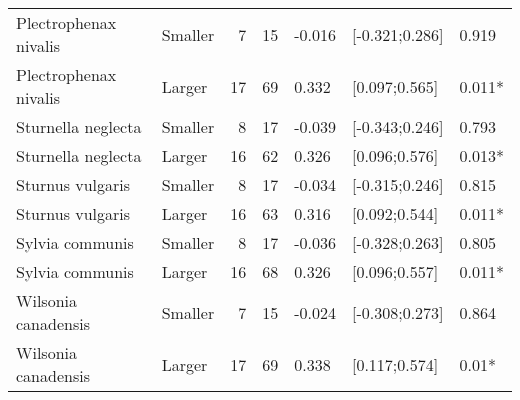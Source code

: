 \documentclass{article}
\begin{document}
\begin{table}[H]
\begin{tabular}{llrrlll}
  Plectrophenax nivalis & Smaller & 7 & 15 & -0.016 & [-0.321;0.286] & 0.919 \\ 
  Plectrophenax nivalis & Larger & 17 & 69 & 0.332 & [0.097;0.565] & 0.011* \\ 
  Sturnella neglecta & Smaller & 8 & 17 & -0.039 & [-0.343;0.246] & 0.793 \\ 
  Sturnella neglecta & Larger & 16 & 62 & 0.326 & [0.096;0.576] & 0.013* \\ 
  Sturnus vulgaris & Smaller & 8 & 17 & -0.034 & [-0.315;0.246] & 0.815 \\ 
  Sturnus vulgaris & Larger & 16 & 63 & 0.316 & [0.092;0.544] & 0.011* \\ 
  Sylvia communis & Smaller & 8 & 17 & -0.036 & [-0.328;0.263] & 0.805 \\ 
  Sylvia communis & Larger & 16 & 68 & 0.326 & [0.096;0.557] & 0.011* \\ 
  Wilsonia canadensis & Smaller & 7 & 15 & -0.024 & [-0.308;0.273] & 0.864 \\ 
  Wilsonia canadensis & Larger & 17 & 69 & 0.338 & [0.117;0.574] & 0.01* \\ 
  \hline
  \end{tabular}
  \end{table}
\end{document}

